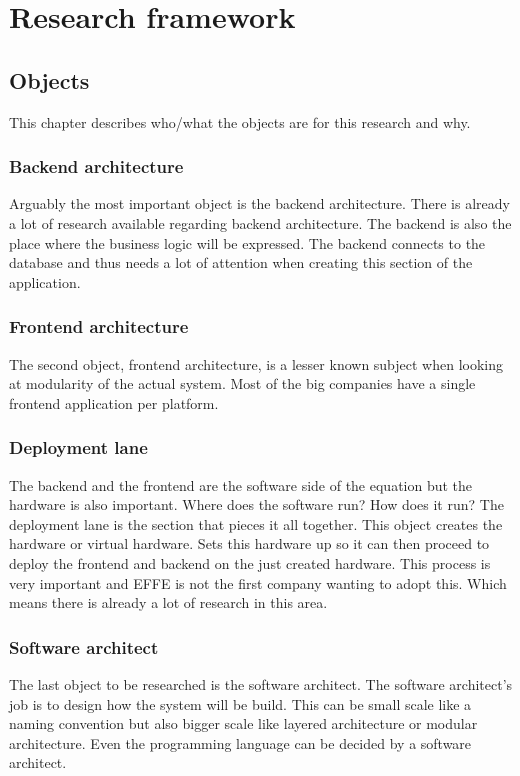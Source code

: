 \section{Research framework}

\subsection{Objects}
This chapter describes who/what the objects are for this research and why.

\subsubsection{Backend architecture}
Arguably the most important object is the backend architecture. There is already a lot of research available regarding backend architecture. The backend is also the place where the business logic will be expressed. The backend connects to the database and thus needs a lot of attention when creating this section of the application.

\subsubsection{Frontend architecture}
The second object, frontend architecture, is a lesser known subject when looking at modularity of the actual system. Most of the big companies have a single frontend application per platform.

\subsubsection{Deployment lane}
\label{sec:DeploymentLane}
The backend and the frontend are the software side of the equation but the hardware is also important. Where does the software run? How does it run? The deployment lane is the section that pieces it all together. This object creates the hardware or virtual hardware. Sets this hardware up so it can then proceed to deploy the frontend and backend on the just created hardware. This process is very important and EFFE is not the first company wanting to adopt this. Which means there is already a lot of research in this area.

\subsubsection{Software architect}
\label{sec:SoftwareArchitect}
The last object to be researched is the software architect. The software architect's job is to design how the system will be build. This can be small scale like a naming convention but also bigger scale like layered architecture or modular architecture. Even the programming language can be decided by a software architect.


